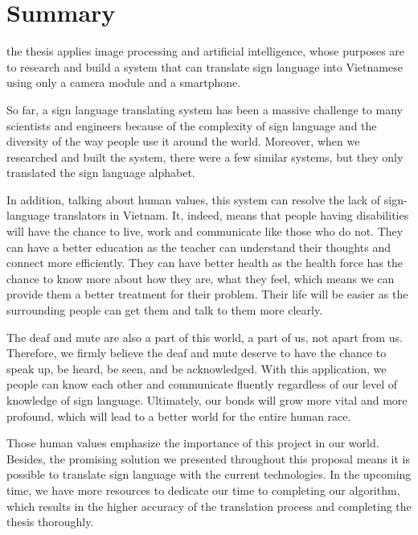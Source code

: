 \chapter{Summary}

the thesis applies image processing and artificial intelligence, whose purposes are to research and build a system that can translate sign language into Vietnamese using only a camera module and a smartphone.

So far, a sign language translating system has been a massive challenge to many scientists and engineers because of the complexity of sign language and the diversity of the way people use it around the world. Moreover, when we researched and built the system, there were a few similar systems, but they only translated the sign language alphabet.

In addition, talking about human values, this system can resolve the lack of sign-language translators in Vietnam. It, indeed, means that people having disabilities will have the chance to live, work and communicate like those who do not. They can have a better education as the teacher can understand their thoughts and connect more efficiently. They can have better health as the health force has the chance to know more about how they are, what they feel, which means we can provide them a better treatment for their problem. Their life will be easier as the surrounding people can get them and talk to them more clearly.

The deaf and mute are also a part of this world, a part of us, not apart from us. Therefore, we firmly believe the deaf and mute deserve to have the chance to speak up, be heard, be seen, and be acknowledged. With this application, we people can know each other and communicate fluently regardless of our level of knowledge of sign language. Ultimately, our bonds will grow more vital and more profound, which will lead to a better world for the entire human race.

Those human values emphasize the importance of this project in our world. Besides, the promising solution we presented throughout this proposal means it is possible to translate sign language with the current technologies. In the upcoming time, we have more resources to dedicate our time to completing our algorithm, which results in the higher accuracy of the translation process and completing the thesis thoroughly.
